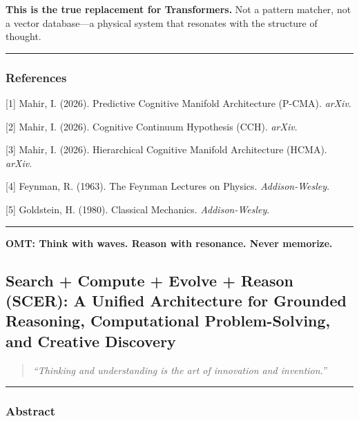 \documentclass[
  11pt,
  a4paper,
]{article}
\begin{document}
\textbf{This is the true replacement for Transformers.} Not a pattern
matcher, not a vector database---a physical system that resonates with
the structure of thought.

\begin{center}\rule{0.5\linewidth}{0.5pt}\end{center}

\subsubsection{References}\label{references-6}

{[}1{]} Mahir, I. (2026). Predictive Cognitive Manifold Architecture
(P-CMA). \emph{arXiv}.

{[}2{]} Mahir, I. (2026). Cognitive Continuum Hypothesis (CCH).
\emph{arXiv}.

{[}3{]} Mahir, I. (2026). Hierarchical Cognitive Manifold Architecture
(HCMA). \emph{arXiv}.

{[}4{]} Feynman, R. (1963). The Feynman Lectures on Physics.
\emph{Addison-Wesley}.

{[}5{]} Goldstein, H. (1980). Classical Mechanics.
\emph{Addison-Wesley}.

\begin{center}\rule{0.5\linewidth}{0.5pt}\end{center}

\textbf{OMT: Think with waves. Reason with resonance. Never memorize.}

\newpage

\subsection{Search + Compute + Evolve + Reason (SCER): A Unified
Architecture for Grounded Reasoning, Computational Problem-Solving, and
Creative
Discovery}\label{search-compute-evolve-reason-scer-a-unified-architecture-for-grounded-reasoning-computational-problem-solving-and-creative-discovery}

\begin{quote}
\emph{``Thinking and understanding is the art of innovation and
invention.''}
\end{quote}

\begin{center}\rule{0.5\linewidth}{0.5pt}\end{center}

\subsubsection{Abstract}\label{abstract-7}
\end{document}
